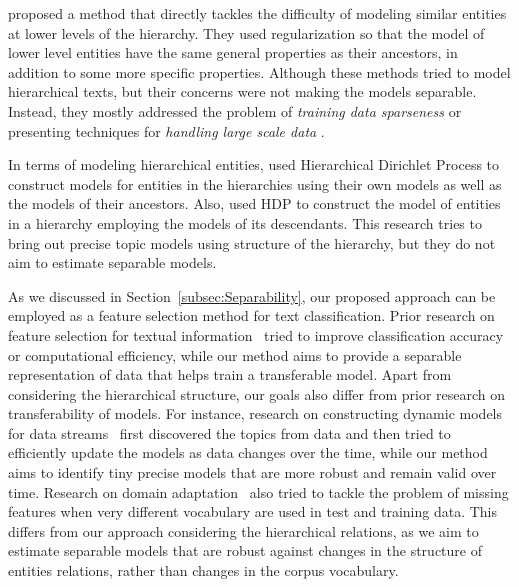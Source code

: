 \citet{Zhou:2011} proposed a method that directly tackles the difficulty of modeling similar entities at lower levels of the hierarchy. They used regularization so that the model of lower level entities have the same general properties as their ancestors, in addition to some more specific properties. 
%
Although these methods tried to model hierarchical texts, but their concerns were not making the models separable. Instead, they mostly addressed the problem of \emph{training data sparseness} \cite{Ha-Thuc:2011,Song:2014,McCallum:1998} or presenting techniques for \emph{handling large scale data} \cite{Gopal:2013,Oh:2011,Xue:2008,Ha-Thuc:2011}.

In terms of modeling hierarchical entities, \citet{Kim:2013} used Hierarchical Dirichlet Process \citep[HDP,][]{Teh:2006} to construct models for entities in the hierarchies using their own models as well as the models of their ancestors.  Also, \citet{Zavitsanos:2011} used HDP to construct the model of entities in a hierarchy employing the models of its descendants. This research tries to bring out precise topic models using structure of the hierarchy, but they do not aim to estimate separable models.  

As we discussed in Section~\ref{subsec:Separability}, our proposed approach can be employed as a feature selection method for text classification. Prior research on feature selection for textual information~\citep{SIGIR-Workshop-2010,Forman:2003} tried to improve classification accuracy or computational efficiency, while our method aims to provide a separable representation of data that helps train a transferable model. 
Apart from considering the hierarchical structure, our goals also differ from prior research on transferability of models. For instance, research on constructing dynamic models for data streams~\citep{Yao:2009,Blei:2006} first discovered the topics from data and then tried to efficiently update the models as data changes over the time, while our method aims to identify tiny precise models that are more robust and remain valid over time.  Research on domain adaptation~\citep{Xue:2008:plsa,Chen:2011} also tried to tackle the problem of missing features when very different vocabulary are used in test and training data.  This differs from our approach considering the hierarchical relations, as we aim to estimate separable models that are robust against changes in the structure of entities relations, rather than changes in the corpus vocabulary.